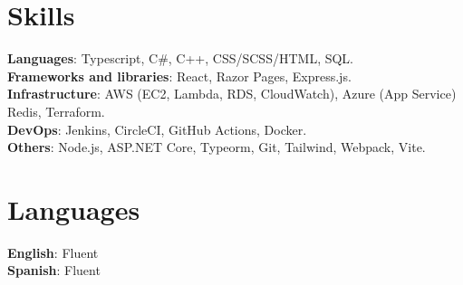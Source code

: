 \documentclass[letterpaper,11pt]{article}
\begin{document}
\begin{minipage}[t]{.78\textwidth}
  \section{Skills}
  \begin{itemize}[leftmargin=0.15in, label={}]
      \small{\item{
      \textbf{Languages}{: Typescript, C\#, C++, CSS/SCSS/HTML, SQL.} \\
      \textbf{Frameworks and libraries}{: React, Razor Pages, Express.js.} \\
      \textbf{Infrastructure}{: AWS (EC2, Lambda, RDS, CloudWatch), Azure (App Service) Redis, Terraform.} \\
      \textbf{DevOps}{: Jenkins, CircleCI, GitHub Actions, Docker.} \\
      \textbf{Others}{: Node.js, ASP.NET Core, Typeorm, Git, Tailwind, Webpack, Vite.} \\
      }}
  \end{itemize}
\end{minipage}\hspace{.02\textwidth}%
\begin{minipage}[t]{.20\textwidth}
  \section{Languages}
  \begin{itemize}[leftmargin=0.0in, label={}]
      \small{\item{
      \textbf{English}{: Fluent} \\
      \textbf{Spanish}{: Fluent} \\
      }}
  \end{itemize}
\end{minipage}\vspace{-10pt}
\end{document}
